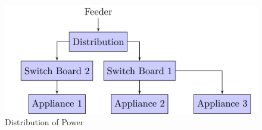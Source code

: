 \begin{figure} 
	\centering
	\includegraphics[width=1\linewidth]{tikz/distribution}
	\caption[Distribution of Power]{Distribution of Power}
	\label{fig:distribution}
	\vspace*{-3ex}
\end{figure}
